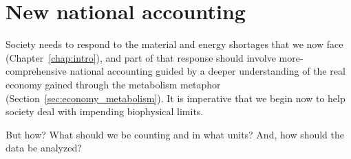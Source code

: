\section{New national accounting}
\label{sec:new_national_accounting}

Society needs to respond 
to the material and energy shortages that
we now face (Chapter~\ref{chap:intro}),
and part of that response
should involve more-comprehensive national accounting 
guided by a deeper understanding of the real economy 
gained through the metabolism metaphor (Section~\ref{sec:economy_metabolism}).
It is imperative that we begin now
to help society deal with impending biophysical limits.

But how? 
What should we be counting and in what units?
And, how should the data be analyzed?



